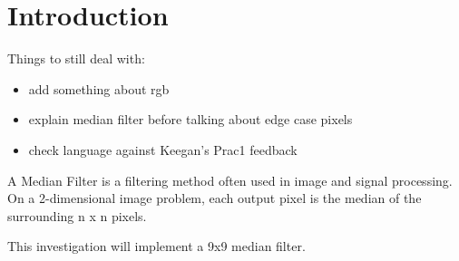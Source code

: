 \section{Introduction}
Things to still deal with:
\begin{itemize}
	\item add something about rgb 
	\item explain median filter before talking about edge case pixels
	\item check language against Keegan's Prac1 feedback
\end{itemize}
A Median Filter is a filtering method often used in image and signal processing. On a 2-dimensional image problem, each output pixel is the median of the surrounding n x n pixels.

This investigation will implement a 9x9 median filter.

